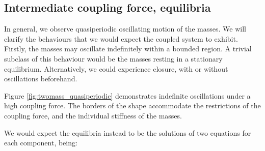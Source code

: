 \documentclass{article}
\begin{document}
\subsection{Intermediate coupling force, equilibria}

In general, we observe quasiperiodic oscillating motion of the masses.
We will clarify the behaviours that we would expect the coupled system to exhibit.
Firstly, the masses may oscillate indefinitely within a bounded region.
A trivial subclass of this behaviour would be the masses resting in a stationary equilibrium.
Alternatively, we could experience closure, with or without oscillations beforehand.

Figure \ref{fig:twomass_quasiperiodic} demonstrates indefinite oscillations under a high coupling force. 
The borders of the shape accommodate the restrictions of the coupling force,
and the individual stiffness of the masses.

We would expect the equilibria instead to be the solutions of two equations for each component, being:
\end{document}
